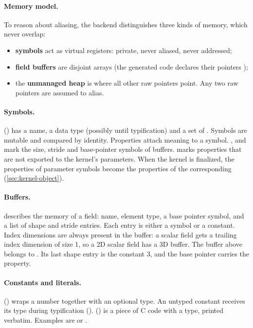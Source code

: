 \paragraph{Memory model.}
To reason about aliasing, the backend distinguishes three kinds of memory, which never
overlap:
\begin{itemize}
  \item \textbf{symbols} act as virtual registers: private, never aliased, never
        addressed;
  \item \textbf{field buffers} are disjoint arrays (the generated code declares their
        pointers );
  \item the \textbf{unmanaged heap} is where all other raw pointers point. Any two raw
        pointers are assumed to alias.
\end{itemize}

\paragraph{Symbols.}
 () has a name, a data type (possibly 
until typification) and a set of . Symbols are mutable and compared by
identity. Properties attach meaning to a symbol. , 
and  mark the size, stride and base-pointer symbols of buffers.
 marks properties that are not exported to the kernel's
parameters. When the kernel is finalized, the properties of parameter symbols become the
properties of the corresponding  (\cref{sec:kernel-object}).

\paragraph{Buffers.}
 describes the memory of a field: name, element type, a base pointer
symbol, and a list of shape and stride entries. Each entry is either a symbol or a
constant. Index dimensions are always present in the buffer: a scalar field gets a
trailing index dimension of size 1, so a 2D scalar field has a 3D buffer. The buffer
above belongs to . Its last shape entry is the constant 3, and
the base pointer  carries the  property.

\paragraph{Constants and literals.}
 () wraps a number together with an optional
type. An untyped constant receives its type during typification
().  () is a piece of
C code with a type, printed verbatim. Examples are  or
.

